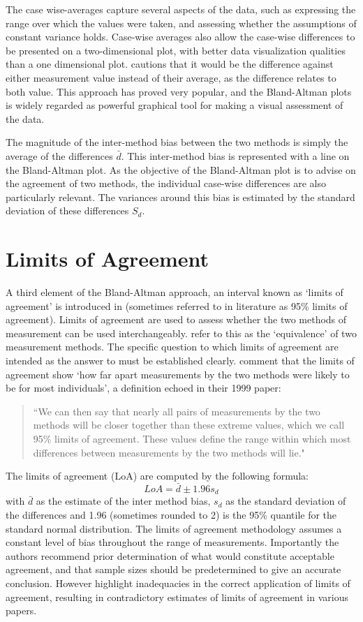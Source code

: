 \documentclass[12pt, a4paper]{report}
\theoremstyle{plain}
\theoremstyle{definition}
\theoremstyle{remark}
\begin{document}
	The case wise-averages capture several aspects of the data, such as expressing the range over which the values were taken, and assessing whether the assumptions of constant variance holds.
	Case-wise averages also allow the case-wise differences to be presented on a two-dimensional plot, with better data visualization qualities than a one dimensional plot. \citet{BA86}
	cautions that it would be the difference against either measurement value instead of their average, as the difference relates to both value. This approach has proved very popular, and the Bland-Altman plots is widely regarded as powerful graphical tool for making a visual assessment of the data.
	
	The magnitude of the inter-method bias between the two methods is simply the average of the differences $\bar{d}$. This inter-method bias is represented with a line on the Bland-Altman plot. As the objective of the Bland-Altman plot is to advise on the agreement of two methods, the individual case-wise differences are also particularly relevant. The variances around this bias is estimated by the standard deviation of these differences $S_{d}$.


	\section{Limits of Agreement}
	A third element of the Bland-Altman approach, an interval known
	as `limits of agreement' is introduced in \citet*{BA86}
	(sometimes referred to in literature as 95\% limits of agreement).
	Limits of agreement are used to assess whether the two methods of
	measurement can be used interchangeably. \citet{BA86} refer to
	this as the `equivalence' of two measurement methods. The specific question to which limits of
	agreement are intended as the answer to must be
	established clearly. \citet*{BA95} comment that the limits of agreement show `how
	far apart measurements by the two methods were likely to be for
	most individuals', a definition echoed in their 1999 paper:
	
	\begin{quote}``We can then say that nearly all pairs
		of measurements by the two methods will be closer together than
		these extreme values, which we call 95\% limits of agreement.
		These values define the range within which most differences
		between measurements by the two methods will lie."
	\end{quote}
	
	The limits of agreement (LoA) are computed by the following
	formula:
	\[
	LoA = \bar{d} \pm 1.96 s_{d}
	\]
	with $\bar{d}$ as the estimate of the inter method bias, $s_{d}$
	as the standard deviation of the differences and 1.96 (sometimes rounded to 2) is the 95\%
	quantile for the standard normal distribution. The limits of agreement methodology assumes a constant level of bias throughout the range of measurements. Importantly the authors recommend prior determination of what would constitute acceptable
	agreement, and that sample sizes should be predetermined to give an accurate conclusion. However \citet{mantha} highlight inadequacies in the correct application of limits of agreement, resulting in contradictory estimates of limits of agreement in various papers.
	
\end{document}
